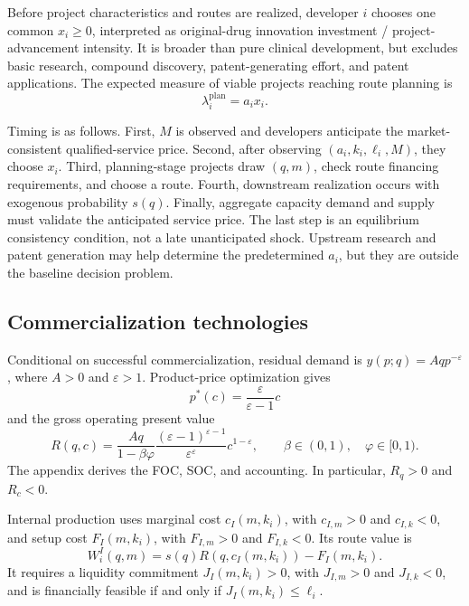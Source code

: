 \documentclass[11pt]{article}
\begin{document}
Before project characteristics and routes are realized, developer \(i\)
chooses one common \(x_i\geq0\), interpreted as original-drug innovation
investment / project-advancement intensity. It is broader than pure clinical
development, but excludes basic research, compound discovery,
patent-generating effort, and patent applications. The expected measure of
viable projects reaching route planning is
\begin{equation}
  \lambda_i^{\mathrm{plan}}=a_ix_i.
  \label{eq:p16m-planning}
\end{equation}

Timing is as follows. First, \(M\) is observed and developers anticipate the
market-consistent qualified-service price. Second, after observing
\((a_i,k_i,\ell_i,M)\), they choose \(x_i\). Third, planning-stage projects
draw \((q,m)\), check route financing requirements, and choose a route. Fourth,
downstream realization occurs with exogenous probability \(s(q)\). Finally,
aggregate capacity demand and supply must validate the anticipated service
price. The last step is an equilibrium consistency condition, not a late
unanticipated shock. Upstream research and patent generation may help
determine the predetermined \(a_i\), but they are outside the baseline
decision problem.

\subsection{Commercialization technologies}
\label{subsec:p16m-technologies}

Conditional on successful commercialization, residual demand is
\(y(p;q)=Aqp^{-\varepsilon}\), where \(A>0\) and \(\varepsilon>1\).
Product-price optimization gives
\[
  p^*(c)=\frac{\varepsilon}{\varepsilon-1}c
\]
and the gross operating present value
\begin{equation}
  R(q,c)
  =
  \frac{Aq}{1-\beta\varphi}
  \frac{(\varepsilon-1)^{\varepsilon-1}}
       {\varepsilon^\varepsilon}
  c^{1-\varepsilon},
  \qquad
  \beta\in(0,1),\quad \varphi\in[0,1).
  \label{eq:p16m-return}
\end{equation}
The appendix derives the FOC, SOC, and accounting. In particular,
\(R_q>0\) and \(R_c<0\).

Internal production uses marginal cost \(c_I(m,k_i)\), with
\(c_{I,m}>0\) and \(c_{I,k}<0\), and setup cost \(F_I(m,k_i)\), with
\(F_{I,m}>0\) and \(F_{I,k}<0\). Its route value is
\begin{equation}
  W_i^I(q,m)
  =
  s(q)R\!\left(q,c_I(m,k_i)\right)-F_I(m,k_i).
  \label{eq:p16m-internal}
\end{equation}
It requires a liquidity commitment \(J_I(m,k_i)>0\), with
\(J_{I,m}>0\) and \(J_{I,k}<0\), and is financially feasible if and only if
\(J_I(m,k_i)\leq\ell_i\).
\end{document}
